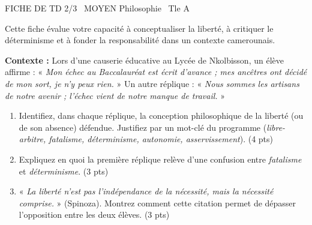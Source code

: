 \documentclass[11pt]{article}
\begin{document}
\begin{tcolorbox}[enhanced,colback=popink,colframe=popink,arc=10pt,boxrule=0pt,left=12pt,right=12pt,top=9pt,bottom=9pt]
{\color{white}\popxbold\small FICHE DE TD 2/3 \textbullet\ MOYEN \hfill Philosophie \textbullet\ Tle A\par}
\end{tcolorbox}
\vspace{4pt}
\noindent Cette fiche évalue votre capacité à conceptualiser la liberté, à critiquer le déterminisme et à fonder la responsabilité dans un contexte camerounais.

\begin{exercice}
\textbf{Contexte :} Lors d'une causerie éducative au Lycée de Nkolbisson, un élève affirme : « \textit{Mon échec au Baccalauréat est écrit d'avance ; mes ancêtres ont décidé de mon sort, je n'y peux rien.} » Un autre réplique : « \textit{Nous sommes les artisans de notre avenir ; l'échec vient de notre manque de travail.} »
\begin{enumerate}
    \item Identifiez, dans chaque réplique, la conception philosophique de la liberté (ou de son absence) défendue. Justifiez par un mot-clé du programme (\textit{libre-arbitre, fatalisme, déterminisme, autonomie, asservissement}). \hfill (4 pts)
    \item Expliquez en quoi la première réplique relève d'une confusion entre \textit{fatalisme} et \textit{déterminisme}. \hfill (3 pts)
    \item « \textit{La liberté n'est pas l'indépendance de la nécessité, mais la nécessité comprise.} » (Spinoza). Montrez comment cette citation permet de dépasser l'opposition entre les deux élèves. \hfill (3 pts)
\end{enumerate}
\end{exercice}
\end{document}
